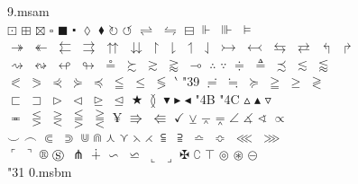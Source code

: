 \documentclass{article}
\begin{document}
9.msam\\
\noindent $\boxdot$ $\boxplus$ $\boxtimes$ $\square$ $\blacksquare$ $\centerdot$ $\lozenge$ $\blacklozenge$ $\circlearrowright$ $\circlearrowleft$ $\rightleftharpoons$ $\leftrightharpoons$ $\boxminus$ $\Vdash$ $\Vvdash$ $\vDash$\\
$\twoheadrightarrow$ $\twoheadleftarrow$ $\leftleftarrows$ $\rightrightarrows$ $\upuparrows$ $\downdownarrows$ $\upharpoonright$ $\downharpoonright$ $\upharpoonleft$ $\downharpoonleft$ $\rightarrowtail$ $\leftarrowtail$ $\leftrightarrows$ $\rightleftarrows$ $\Lsh$ $\Rsh$\\
$\rightsquigarrow$ $\leftrightsquigarrow$ $\looparrowleft$ $\looparrowright$ $\circeq$ $\succsim$ $\gtrsim$ $\gtrapprox$ $\multimap$ $\therefore$ $\because$ $\doteqdot$ $\triangleq$ $\precsim$ $\lesssim$ $\lessapprox$\\
$\eqslantless$ $\eqslantgtr$ $\curlyeqprec$ $\curlyeqsucc$ $\preccurlyeq$ $\leqq$ $\leqslant$ $\lessgtr$ $\backprime$ \selectfont\char"39 $\risingdotseq$ $\fallingdotseq$ $\succcurlyeq$ $\geqq$ $\geqslant$ $\gtrless$\\
$\sqsubset$ $\sqsupset$ $\vartriangleright$ $\vartriangleleft$ $\trianglerighteq$ $\trianglelefteq$ $\bigstar$ $\between$ $\blacktriangledown$ $\blacktriangleright$ $\blacktriangleleft$ \selectfont\char"4B  \selectfont\char"4C $\vartriangle$ $\blacktriangle$ $\triangledown$ \\
$\eqcirc$ $\lesseqgtr$ $\gtreqless$ $\lesseqqgtr$ $\gtreqqless$ $\yen$ $\Rrightarrow$ $\Lleftarrow$ $\checkmark$ $\veebar$ $\barwedge$ $\doublebarwedge$ $\angle$ $\measuredangle$ $\sphericalangle$ $\varpropto$\\
$\smallsmile$ $\smallfrown$ $\Subset$ $\Supset$ $\Cup$ $\Cap$ $\curlywedge$ $\curlyvee$ $\leftthreetimes$ $\rightthreetimes$ $\subseteqq$ $\supseteqq$ $\bumpeq$ $\Bumpeq$ $\lll$ $\ggg$\\
$\ulcorner$ $\urcorner$ $\circledR$ $\circledS$ $\pitchfork$ $\dotplus$ $\backsim$ $\backsimeq$ $\llcorner$ $\lrcorner$ $\maltese$ $\complement$ $\intercal$ $\circledcirc$ $\circledast$ $\circleddash$\\
\selectfont\char"31 0.msbm\\
\noindent 
\end{document}

